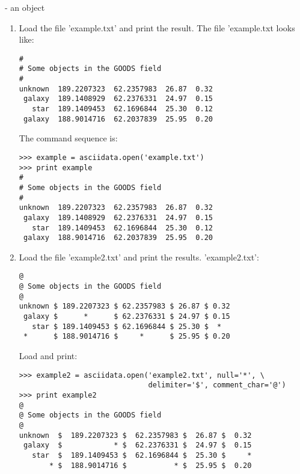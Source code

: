 - an \ad object

\begin{enumerate}
\item Load the file 'example.txt' and print the result. The file 'example.txt
looks like:
\begin{small}
\begin{verbatim}
#
# Some objects in the GOODS field
#
unknown  189.2207323  62.2357983  26.87  0.32
 galaxy  189.1408929  62.2376331  24.97  0.15
   star  189.1409453  62.1696844  25.30  0.12
 galaxy  188.9014716  62.2037839  25.95  0.20
\end{verbatim}
\end{small}
The command sequence is:
\begin{small}
\begin{verbatim}
>>> example = asciidata.open('example.txt')
>>> print example
#
# Some objects in the GOODS field
#
unknown  189.2207323  62.2357983  26.87  0.32
 galaxy  189.1408929  62.2376331  24.97  0.15
   star  189.1409453  62.1696844  25.30  0.12
 galaxy  188.9014716  62.2037839  25.95  0.20
\end{verbatim}
\end{small}

\item Load the file 'example2.txt' and print the results. 'example2.txt':
\begin{small}
\begin{verbatim}
@
@ Some objects in the GOODS field
@
unknown $ 189.2207323 $ 62.2357983 $ 26.87 $ 0.32
 galaxy $      *      $ 62.2376331 $ 24.97 $ 0.15
   star $ 189.1409453 $ 62.1696844 $ 25.30 $  *
 *      $ 188.9014716 $     *      $ 25.95 $ 0.20
\end{verbatim}
\end{small}

Load and print:
\begin{small}
\begin{verbatim}
>>> example2 = asciidata.open('example2.txt', null='*', \
                              delimiter='$', comment_char='@')
>>> print example2
@
@ Some objects in the GOODS field
@
unknown  $  189.2207323 $  62.2357983 $  26.87 $  0.32
 galaxy  $            * $  62.2376331 $  24.97 $  0.15
   star  $  189.1409453 $  62.1696844 $  25.30 $     *
       * $  188.9014716 $           * $  25.95 $  0.20
\end{verbatim}
\end{small}

\end{enumerate}

